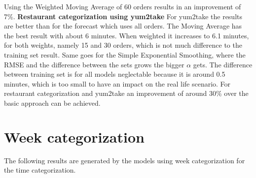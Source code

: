 Using the Weighted Moving Average of 60 orders results in an improvement of 7\%.
\newline\newline\textbf{Restaurant categorization using yum2take}\newline
For yum2take the results are better than for the forecast which uses all orders. The Moving Average has the best result with about 6 minutes. When weighted it increases to 6.1 minutes, for both weights, namely 15 and 30 orders, which is not much difference to the training set result. Same goes for the Simple Exponential Smoothing, where the RMSE and the difference between the sets grows the bigger $\alpha$ gets. The difference between training set is for all models neglectable because it is around 0.5 minutes, which is too small to have an impact on the real life scenario.\newline
For restaurant categorization and yum2take an improvement of around 30\% over the basic approach can be achieved.
\section{Week categorization}\label{section:Week categorization}
The following results are generated by the models using week categorization for the time categorization.
